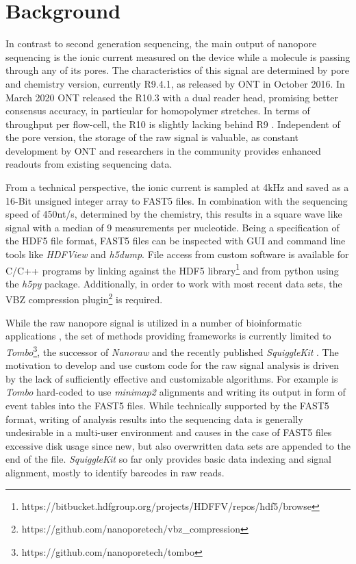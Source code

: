 \section{Background}
\label{sec:signal:background}

In contrast to second generation sequencing, the main output of nanopore sequencing is the ionic current measured on the device while a molecule is passing through any of its pores. The characteristics of this signal are determined by pore and chemistry version, currently R9.4.1, as released by ONT in October 2016. In March 2020 ONT released the R10.3 with a dual reader head, promising better consensus accuracy, in particular for homopolymer stretches. In terms of throughput per flow-cell, the R10 is slightly lacking behind R9 \cite{ONT2020}. Independent of the pore version, the storage of the raw signal is valuable, as constant development by ONT and researchers in the community provides enhanced readouts from existing sequencing data.

From a technical perspective, the ionic current is sampled at 4kHz and saved as a 16-Bit unsigned integer array to FAST5 files. In combination with the sequencing speed of \texttildelow450nt/s, determined by the chemistry, this results in a square wave like signal with a median of 9 measurements per nucleotide. Being a specification of the HDF5 file format, FAST5 files can be inspected with GUI and command line tools like \textit{HDFView} and \textit{h5dump}. File access from custom software is available for C/C++ programs by linking against the HDF5 library\footnote{https://bitbucket.hdfgroup.org/projects/HDFFV/repos/hdf5/browse} and from python using the \textit{h5py} package. Additionally, in order to work with most recent data sets, the VBZ compression plugin\footnote{https://github.com/nanoporetech/vbz\_compression} is required.

While the raw nanopore signal is utilized in a number of bioinformatic applications \cite{Simpson2017, Wick2018, Loose2016}, the set of methods providing frameworks is currently limited to \textit{Tombo}\footnote{https://github.com/nanoporetech/tombo}, the successor of \textit{Nanoraw} \cite{Stoiber2017} and the recently published \textit{SquiggleKit} \cite{Ferguson2019}. The motivation to develop and use custom code for the raw signal analysis is driven by the lack of sufficiently effective and customizable algorithms. For example is \textit{Tombo} hard-coded to use \textit{minimap2} alignments and writing its output in form of event tables into the FAST5 files. While technically supported by the FAST5 format, writing of analysis results into the sequencing data is generally undesirable in a multi-user environment and causes in the case of FAST5 files excessive disk usage since new, but also overwritten data sets are appended to the end of the file. \textit{SquiggleKit} so far only provides basic data indexing and signal alignment, mostly to identify barcodes in raw reads.

